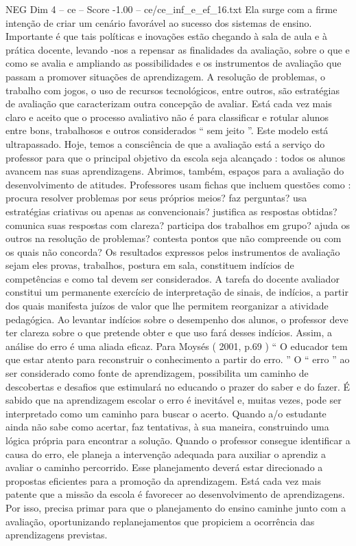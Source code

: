 \begin{textsample}{NEG Dim 4 – ce – Score -1.00 – ce/ce\_inf\_e\_ef\_16.txt}
Ela surge com a firme intenção de criar um cenário favorável ao sucesso dos sistemas de ensino.
Importante é que tais políticas e inovações estão chegando à sala de aula e à prática docente, levando -nos a repensar as finalidades da avaliação, sobre o que e como se avalia e ampliando as possibilidades e os instrumentos de avaliação que passam a promover situações de aprendizagem.
A resolução de problemas, o trabalho com jogos, o uso de recursos tecnológicos, entre outros, são estratégias de avaliação que caracterizam outra concepção de avaliar.
Está cada vez mais claro e aceito que o processo avaliativo não é para classificar e rotular alunos entre bons, trabalhosos e outros considerados “ sem jeito ”.
Este modelo está ultrapassado.
Hoje, temos a consciência de que a avaliação está a serviço do professor para que o principal objetivo da escola seja alcançado : todos os alunos avancem nas suas aprendizagens.
Abrimos, também, espaços para a avaliação do desenvolvimento de atitudes.
Professores usam fichas que incluem questões como : procura resolver problemas por seus próprios meios? faz perguntas? usa estratégias criativas ou apenas as convencionais? justifica as respostas obtidas? comunica suas respostas com clareza? participa dos trabalhos em grupo? ajuda os outros na resolução de problemas? contesta pontos que não compreende ou com os quais não concorda?
Os resultados expressos pelos instrumentos de avaliação sejam eles provas, trabalhos, postura em sala, constituem indícios de competências e como tal devem ser considerados.
A tarefa do docente avaliador constitui um permanente exercício de interpretação de sinais, de indícios, a partir dos quais manifesta juízos de valor que lhe permitem reorganizar a atividade pedagógica.
Ao levantar indícios sobre o desempenho dos alunos, o professor deve ter clareza sobre o que pretende obter e que uso fará desses indícios.
Assim, a análise do erro é uma aliada eficaz.
Para Moysés ( 2001, p.69 ) “ O educador tem que estar atento para reconstruir o conhecimento a partir do erro. ” O “ erro ” ao ser considerado como fonte de aprendizagem, possibilita um caminho de descobertas e desafios que estimulará no educando o prazer do saber e do fazer.
É sabido que na aprendizagem escolar o erro é inevitável e, muitas vezes, pode ser interpretado como um caminho para buscar o acerto.
Quando a/o estudante ainda não sabe como acertar, faz tentativas, à sua maneira, construindo uma lógica própria para encontrar a solução.
Quando o professor consegue identificar a causa do erro, ele planeja a intervenção adequada para auxiliar o aprendiz a avaliar o caminho percorrido.
Esse planejamento deverá estar direcionado a propostas eficientes para a promoção da aprendizagem.
Está cada vez mais patente que a missão da escola é favorecer ao desenvolvimento de aprendizagens.
Por isso, precisa primar para que o planejamento do ensino caminhe junto com a avaliação, oportunizando replanejamentos que propiciem a ocorrência das aprendizagens previstas.

\end{textsample}
